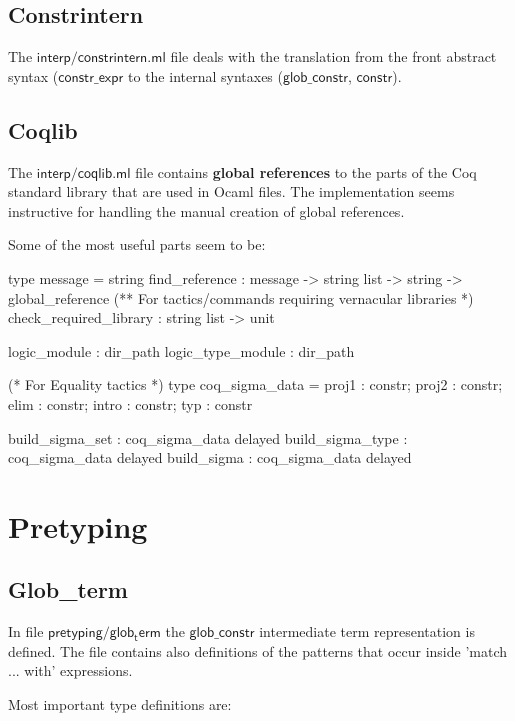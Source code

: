 \documentclass[a4paper,oneside]{book}
\newcommand{\m}[1]{\ensuremath{\mathsf{#1}}}
\begin{document}
\subsection{Constrintern}

The \m{interp/constrintern.ml} file deals with the translation from
the front abstract syntax (\m{constr\_expr} to the internal syntaxes
(\m{glob\_constr}, \m{constr}).

\subsection{Coqlib}

The \m{interp/coqlib.ml} file contains \textbf{global references} to
the parts of the Coq standard library that are used in Ocaml files.
The implementation seems instructive for handling the manual creation
of global references.

Some of the most useful parts seem to be:

\begin{code}
type message = string
find_reference : message -> string list -> string -> global_reference
(** For tactics/commands requiring vernacular libraries *)
check_required_library : string list -> unit

logic_module : dir_path
logic_type_module : dir_path

(* For Equality tactics *)
type coq_sigma_data = {
  proj1 : constr;
  proj2 : constr;
  elim  : constr;
  intro : constr;
  typ   : constr }

build_sigma_set : coq_sigma_data delayed
build_sigma_type : coq_sigma_data delayed
build_sigma : coq_sigma_data delayed
\end{code}

\section{Pretyping}

\subsection{Glob\_term}

In file \m{pretyping/glob_term} the \m{glob\_constr} intermediate term
representation is defined. The file contains also definitions of
the patterns that occur inside 'match ... with' expressions.

Most important type definitions are:
\end{document}
